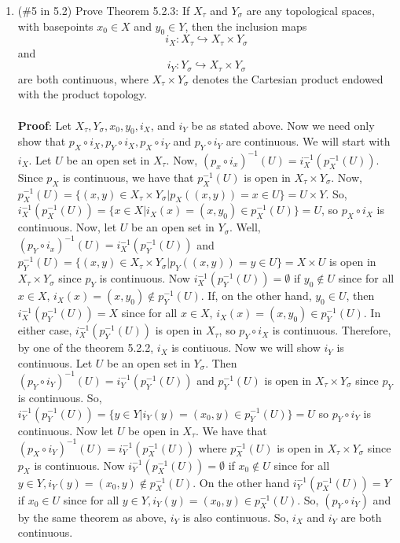 \documentclass[12pt]{article}
\begin{document}
\begin{enumerate}

\item (\#5 in 5.2) Prove Theorem 5.2.3: If $X_{\tau}$ and $Y_{\sigma}$ are any topological spaces, with basepoints $x_0\in X$ and $y_0\in Y$, then the inclusion maps $$i_X:X_{\tau}\hookrightarrow X_{\tau}\times Y_{\sigma}$$ and $$i_Y:Y_{\sigma}\hookrightarrow X_{\tau}\times Y_{\sigma}$$ are both continuous, where $X_{\tau}\times Y_{\sigma}$ denotes the Cartesian product endowed with the product topology.\\\\

\textbf{Proof}: Let $X_{\tau}, Y_{\sigma}, x_0, y_0, i_X$, and $i_Y$ be as stated above. Now we need only show that $p_X\circ i_X, p_Y\circ i_X, p_X\circ i_Y$ and $p_Y\circ i_Y$ are continuous. We will start with $i_X$. Let $U$ be an open set in $X_{\tau}$. Now, $(p_x\circ i_x)^{-1}(U)=i_X^{-1}(p_X^{-1}(U))$. Since $p_X$ is continuous, we have that $p_X^{-1}(U)$ is open in $X_{\tau}\times Y_{\sigma}$. Now, $p_X^{-1}(U)=\{(x,y)\in X_{\tau}\times Y_{\sigma}|p_X((x,y))=x\in U\}=U\times Y$. So, $i_X^{-1}(p_X^{-1}(U))=\{x\in X|i_X(x)=(x,y_0)\in p_X^{-1}(U)\}=U$, so $p_X\circ i_X$ is continuous. Now, let $U$ be an open set in $Y_{\sigma}$. Well, $(p_Y\circ i_x)^{-1}(U)=i_X^{-1}(p_Y^{-1}(U))$ and $p_Y^{-1}(U)=\{(x,y)\in X_{\tau}\times Y_{\sigma}|p_Y((x,y))=y\in U\}=X\times U$ is open in $X_{\tau}\times Y_{\sigma}$ since $p_Y$ is continuous. Now $i_X^{-1}(p_Y^{-1}(U))=\emptyset$ if $y_0\notin U$ since for all $x\in X$, $i_X(x)=(x,y_0)\notin p_Y^{-1}(U)$. If, on the other hand, $y_0\in U$, then $i_X^{-1}(p_Y^{-1}(U))=X$ since for all $x\in X$, $i_X(x)=(x,y_0)\in p_Y^{-1}(U)$. In either case, $i_X^{-1}(p_Y^{-1}(U))$ is open in $X_{\tau}$, so $p_Y\circ i_X$ is continuous. Therefore, by one of the theorem 5.2.2, $i_X$ is contiuous. Now we will show $i_Y$ is continuous. Let $U$ be an open set in $Y_{\sigma}$. Then $(p_Y\circ i_Y)^{-1}(U)=i_Y^{-1}(p_Y^{-1}(U))$ and $p_Y^{-1}(U)$ is open in $X_{\tau}\times Y_{\sigma}$ since $p_Y$ is continuous. So, $i_Y^{-1}(p_Y^{-1}(U))=\{y\in Y|i_Y(y)=(x_0,y)\in p_Y^{-1}(U)\}=U$ so $p_Y\circ i_Y$ is continuous. Now let $U$ be open in $X_{\tau}$. We have that $(p_X\circ i_Y)^{-1}(U)=i_Y^{-1}(p_X^{-1}(U))$ where $p_X^{-1}(U)$ is open in $X_{\tau}\times Y_{\sigma}$ since $p_X$ is continuous. Now $i_Y^{-1}(p_X^{-1}(U))=\emptyset$ if $x_0\notin U$ since for all $y\in Y, i_Y(y)=(x_0,y)\notin p_X^{-1}(U)$. On the other hand $i_Y^{-1}(p_X^{-1}(U))=Y$ if $x_0\in U$ since for all $y\in Y, i_Y(y)=(x_0,y)\in p_X^{-1}(U)$. So, $(p_Y\circ i_Y)$ and by the same theorem as above, $i_Y$ is also continuous. So, $i_X$ and $i_Y$ are both continuous.


\end{enumerate}
\end{document}
